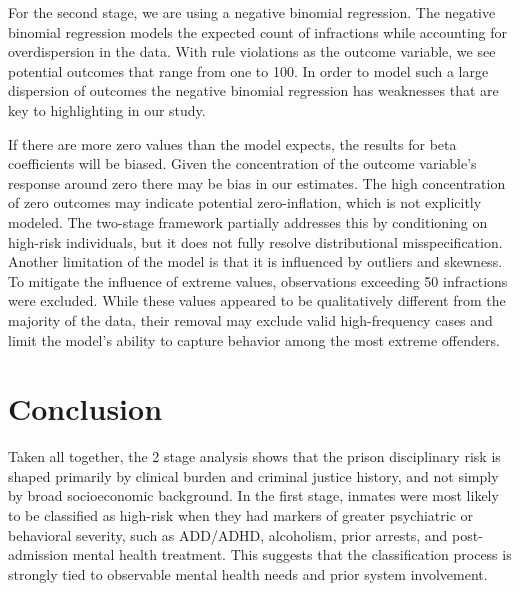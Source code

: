\documentclass[
]{article}
\begin{document}
For the second stage, we are using a negative binomial regression. The
negative binomial regression models the expected count of infractions
while accounting for overdispersion in the data. With rule violations as
the outcome variable, we see potential outcomes that range from one to
100. In order to model such a large dispersion of outcomes the negative
binomial regression has weaknesses that are key to highlighting in our
study.

If there are more zero values than the model expects, the results for
beta coefficients will be biased. Given the concentration of the outcome
variable's response around zero there may be bias in our estimates. The
high concentration of zero outcomes may indicate potential
zero-inflation, which is not explicitly modeled. The two-stage framework
partially addresses this by conditioning on high-risk individuals, but
it does not fully resolve distributional misspecification. Another
limitation of the model is that it is influenced by outliers and
skewness. To mitigate the influence of extreme values, observations
exceeding 50 infractions were excluded. While these values appeared to
be qualitatively different from the majority of the data, their removal
may exclude valid high-frequency cases and limit the model's ability to
capture behavior among the most extreme offenders.

\section{Conclusion}\label{conclusion}

Taken all together, the 2 stage analysis shows that the prison
disciplinary risk is shaped primarily by clinical burden and criminal
justice history, and not simply by broad socioeconomic background. In
the first stage, inmates were most likely to be classified as high-risk
when they had markers of greater psychiatric or behavioral severity,
such as ADD/ADHD, alcoholism, prior arrests, and post-admission mental
health treatment. This suggests that the classification process is
strongly tied to observable mental health needs and prior system
involvement.
\end{document}
